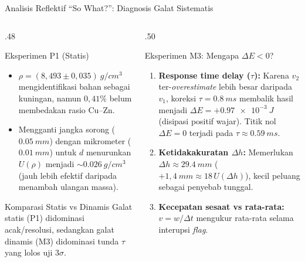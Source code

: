 \documentclass[aspectratio=169,10pt]{beamer}
\newcommand{\sm}{\fontsize{8.2}{10.2}\selectfont}
\newcommand{\xs}{\fontsize{7.1}{9}\selectfont}
\begin{document}
\begin{frame}{Analisis Reflektif ``So What?'': Diagnosis Galat Sistematis}
\begin{columns}[T,onlytextwidth]
\begin{column}{.48\textwidth}
\begin{block}{Eksperimen P1 (Statis)}\sm
\begin{itemize}
\item $\rho = (8{,}493 \pm 0{,}035)\ \si{g/cm^3}$ mengidentifikasi bahan sebagai kuningan, namun $0{,}41\%$ belum membedakan rasio Cu--Zn.
\item Mengganti jangka sorong ($\SI{0,05}{mm}$) dengan mikrometer ($\SI{0,01}{mm}$) untuk $d$ menurunkan $U(\rho)$ menjadi $\sim \SI{0,026}{g/cm^3}$ (jauh lebih efektif daripada menambah ulangan massa).
\end{itemize}
\end{block}
\begin{exampleblock}{Komparasi Statis vs Dinamis}\xs
Galat statis (P1) didominasi acak/resolusi, sedangkan galat dinamis (M3) didominasi tunda $\tau$ yang lolos uji $3\sigma$.
\end{exampleblock}
\end{column}

\begin{column}{.50\textwidth}
\begin{alertblock}{Eksperimen M3: Mengapa $\Delta E < 0$?}\sm
\begin{enumerate}
\item \textbf{Response time delay ($\tau$):} Karena $v_2$ ter-\textit{overestimate} lebih besar daripada $v_1$, koreksi $\tau=\SI{0,8}{ms}$ membalik hasil menjadi $\Delta E = +\SI{0,97e-3}{J}$ (disipasi positif wajar). Titik nol $\Delta E = 0$ terjadi pada $\tau \approx \SI{0,59}{ms}$.
\item \textbf{Ketidakakuratan $\Delta h$:} Memerlukan $\Delta h \approx \SI{29,4}{mm}$ ($+1{,}4\ \si{mm} \approx 18\,U(\Delta h)$), kecil peluang sebagai penyebab tunggal.
\item \textbf{Kecepatan sesaat vs rata-rata:} $v=w/\Delta t$ mengukur rata-rata selama interupsi \textit{flag}.
\end{enumerate}
\end{alertblock}
\end{column}
\end{columns}
\end{frame}
\end{document}
